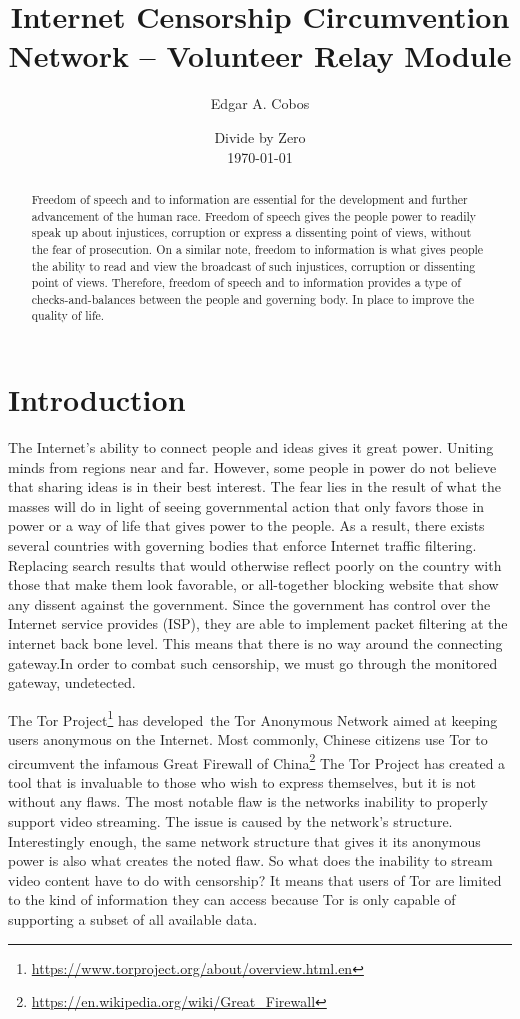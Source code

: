 \documentclass[12pt,a4paper]{report}
\title{Internet Censorship Circumvention Network – Volunteer Relay Module}
\author{Edgar A. Cobos}
\date{Divide by Zero\\\today}
\begin{document}
\maketitle

\begin{abstract}
Freedom of speech and to information are essential for the development and further advancement of the human race. Freedom of speech gives the people power to readily speak up about injustices, corruption or express a dissenting point of views, without the fear of prosecution. On a similar note, freedom to information is what gives people the ability to read and view the broadcast of such injustices, corruption or dissenting point of views. Therefore, freedom of speech and to information provides a type of checks-and-balances between the people and governing body. In place to improve the quality of life. 


\end{abstract}

\renewcommand{\chaptername}{Section}
\tableofcontents

\chapter{Introduction}
The Internet’s ability to connect people and ideas gives it great power. Uniting minds from regions near and far. However, some people in power do not believe that sharing ideas is in their best interest. The fear lies in the result of what the masses will do in light of seeing governmental action that only favors those in power or a way of life that gives power to the people. As a result, there exists several countries with governing bodies that enforce Internet traffic filtering. Replacing search results that would otherwise reflect poorly on the country with those that make them look favorable, or all-together blocking website that show any dissent against the government. Since the government has control over the Internet service provides (ISP), they are able to implement packet filtering at the internet back bone level. This means that there is no way around the connecting gateway.In order to combat such censorship, we must go through the monitored gateway, undetected.

The Tor Project\footnote{\url{https://www.torproject.org/about/overview.html.en}} has developed the Tor Anonymous Network aimed at keeping users anonymous on the Internet. Most commonly, Chinese citizens use Tor to circumvent the infamous Great Firewall of China\footnote{\url{https://en.wikipedia.org/wiki/Great_Firewall}} The Tor Project has created a tool that is invaluable to those who wish to express themselves, but it is not without any flaws. The most notable flaw is the networks inability to properly support video streaming. The issue is caused by the network's structure. Interestingly enough, the same network structure that gives it its anonymous power is also what creates the noted flaw. So what does the inability to stream video content have to do with censorship? It means that users of Tor are limited to the kind of information they can access because Tor is only capable of supporting a subset of all available data. 
    
\end{document}
